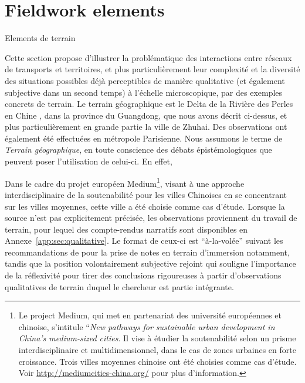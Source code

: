 


\newpage


\section{Fieldwork elements}{Elements de terrain}

\label{sec:qualitative}




Cette section propose d'illustrer la problématique des interactions entre réseaux de transports et territoires, et plus particulièrement leur complexité et la diversité des situations possibles déjà perceptibles de manière qualitative (et également subjective dans un second temps) à l'échelle microscopique, par des exemples concrets de terrain. Le terrain géographique est le Delta de la Rivière des Perles en Chine , dans la province du Guangdong, que nous avons décrit ci-dessus, et plus particulièrement en grande partie la ville de Zhuhai. Des observations ont également été effectuées en métropole Parisienne. Nous assumons le terme de \emph{Terrain géographique}, en toute conscience des débats épistémologiques que peuvent poser l'utilisation de celui-ci. En effet, 


Dans le cadre du projet européen Medium\footnote{Le project Medium, qui met en partenariat des université européennes et chinoise, s'intitule ``\textit{New pathways for sustainable urban development in China’s medium-sized cities}. Il vise à étudier la soutenabilité selon un prisme interdisciplinaire et multidimensionnel, dans le cas de zones urbaines en forte croissance. Trois villes moyennes chinoise ont été choisies comme cas d'étude. Voir \url{http://mediumcities-china.org/} pour plus d'information.}, visant à une approche interdisciplinaire de la soutenabilité pour les villes Chinoises en se concentrant sur les villes moyennes, cette ville a été choisie comme cas d'étude. Lorsque la source n'est pas explicitement précisée, les observations proviennent du travail de terrain, pour lequel des compte-rendus narratifs sont disponibles en Annexe~\ref{app:sec:qualitative}. Le format de ceux-ci est ``à-la-volée'' suivant les recommandations de \cite{goffman1989fieldwork} pour la prise de notes en terrain d'immersion notamment, tandis que la position volontairement subjective rejoint \cite{ball1990self} qui souligne l'importance de la réflexivité pour tirer des conclusions rigoureuses à partir d'observations qualitatives de terrain duquel le chercheur est partie intégrante.





